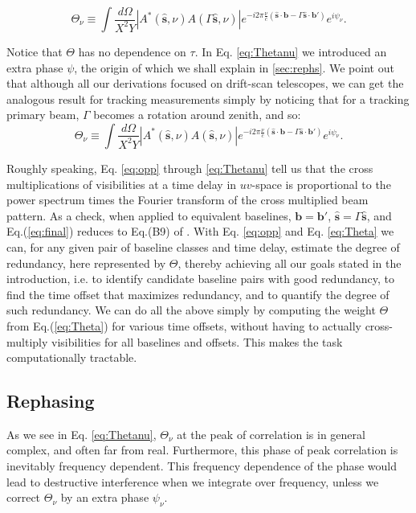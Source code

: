 \documentclass[twocolumn,apj,numberedappendix]{emulateapj}
\renewcommand\[{\begin{equation}}
\renewcommand\]{\end{equation}}
\begin{document}
\[
\Theta_{\nu} \equiv \int \frac{d\Omega}{X^{2}Y}|A^{*}(\hat{\boldsymbol{s}},\nu)A(\Gamma\hat{\boldsymbol{s}},\nu)| e^{-i2\pi\frac{\nu}{c}\left(\hat{\boldsymbol{s}}\cdot\boldsymbol{b}-\Gamma\hat{\boldsymbol{s}}\cdot\boldsymbol{b'}\right)}e^{i\psi_{\nu}}.
\label{eq:Thetanu}
\]


Notice that $\Theta$ has no dependence on $\tau$. In Eq. \ref{eq:Thetanu} we introduced an extra phase $\psi$, the origin of which we shall explain in \ref{sec:rephs}. We point out that although all our derivations focused on drift-scan telescopes, we can get the analogous result for tracking measurements simply by noticing that for a tracking primary beam, $\Gamma$ becomes a rotation around zenith, and so:
\[
\Theta_{\nu} \equiv \int \frac{d\Omega}{X^{2}Y}|A^{*}(\hat{\boldsymbol{s}},\nu)A(\hat{\boldsymbol{s}},\nu)| e^{-i2\pi\frac{\nu}{c}\left(\hat{\boldsymbol{s}}\cdot\boldsymbol{b}-\Gamma\hat{\boldsymbol{s}}\cdot\boldsymbol{b'}\right)}e^{i\psi_{\nu}}.
\label{eq:Thetanu_tracking}
\]

Roughly speaking, Eq. \ref{eq:opp} through \ref{eq:Thetanu} tell us that the cross multiplications of visibilities at a time delay
in $uv$-space is proportional to the power spectrum times the Fourier
transform of the cross multiplied beam pattern. As a check, when applied to equivalent baselines,
$\boldsymbol{b}=\boldsymbol{b'}$, $\hat{\boldsymbol{s}}=\Gamma\hat{\boldsymbol{s}}$, and Eq.(\ref{eq:final}) reduces to Eq.(B9) of \cite{paper32}. 
With Eq. \ref{eq:opp} and Eq. \ref{eq:Theta} we can, for any given pair of baseline classes and time delay, estimate the degree of redundancy, here represented by $\Theta$, thereby achieving all our goals stated in the introduction, i.e. to identify 
candidate baseline pairs with good redundancy, to find the time offset that maximizes redundancy, and to quantify the degree of such redundancy. We can do all the above simply by computing the weight $\Theta$ from
Eq.(\ref{eq:Theta}) for various time offsets, without having to actually cross-multiply visibilities for all baselines and offsets. This makes the task computationally tractable. 



\subsection{Rephasing \label{sec:rephs}}
As we see in Eq. \ref{eq:Thetanu}, $\Theta_{\nu}$ at the peak of correlation is in general complex, and often far from real. Furthermore, this phase of peak correlation is inevitably frequency dependent. This frequency dependence of the phase would lead to destructive interference when we integrate over frequency, unless we correct $\Theta_{\nu}$ by an extra phase $\psi_\nu$. 
\end{document}
